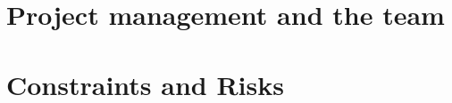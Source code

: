 \documentclass[manuscript]{acmart}
\begin{document}
\newpage

\section{Project management and the team}

\label{sec:project-management}


\newpage
\section{Constraints and Risks}


\end{document}
